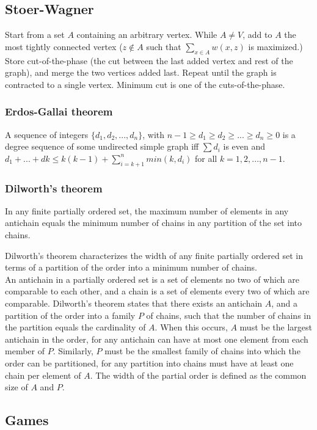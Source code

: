 \documentclass[a4paper,13pt]{article}
\newcommand\includefile[3]{
   \subsection{#1}
   \begin{multicols}{2}
    
   \end{multicols}
}
\begin{document}
\includefile{Stoer-Wagner}{../lib}{stoer_wagner.cpp}
Start from a set $A$ containing an arbitrary vertex. While $A \neq V$, add to $A$ the most tightly connected vertex ($z \not\in A$ such that $\sum_{x\in A}w(x,z)$ is maximized.)
Store cut-of-the-phase (the cut between the last added vertex and rest of the graph), and merge the two vertices added last. Repeat until the graph is contracted to a single vertex. Minimum cut is one of the cuts-of-the-phase.

\subsubsection{Erdos-Gallai theorem}
A sequence of integers $\{d_1,d_2,...,d_n\}$, with $n-1 \geq d_1 \geq d_2 \geq ... \geq d_n \geq 0$ is a degree sequence of some undirected simple graph iff $\sum d_i$ is even and $d_1+ ... + dk \leq k(k-1)+ \sum_{i=k+1}^{n}min(k, d_i)$
for all $k = 1, 2, . . . , n - 1$.

\subsubsection{Dilworth's theorem}
In any finite partially ordered set, the maximum number of elements in any antichain equals the minimum number of chains in any partition of the set into chains.

Dilworth's theorem characterizes the width of any finite partially ordered set in terms of a partition of the order into a minimum number of chains.\\
An antichain in a partially ordered set is a set of elements no two of which are comparable to each other, and a chain is a set of elements every two of which are comparable. Dilworth's theorem states that there exists an antichain $A$,
and a partition of the order into a family $P$ of chains, such that the number of chains in the partition equals the cardinality of $A$. When this occurs, $A$ must be the largest antichain in the order, for any antichain can have at most one
element from each member of $P$. Similarly, $P$ must be the smallest family of chains into which the order can be partitioned, for any partition into chains must have at least one chain per element of $A$. The width of the partial order is
defined as the common size of $A$ and $P$.

\subsection{Games}
\end{document}
